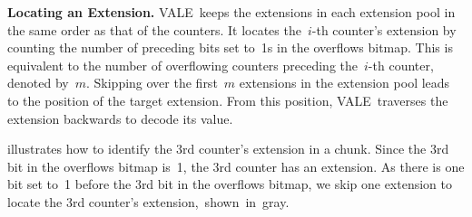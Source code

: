 \documentclass[sigconf]{acmart}
\newcommand{\counterencodingabbrv}{VALE}
\begin{document}
\textbf{Locating an Extension.}
\counterencodingabbrv\ keeps the extensions in each extension pool in the same
order as that of the counters. It locates the~$i${\nobreakdash-}th counter's
extension by counting the number of preceding bits set to~1s in the overflows
bitmap. This is equivalent to the number of overflowing counters preceding
the~$i${\nobreakdash-}th counter, denoted by~$m$. Skipping over the first~$m$
extensions in the extension pool leads to the position of the target extension.
From this position, \counterencodingabbrv\ traverses the extension backwards to
decode its value.

illustrates how to identify the 3rd counter's extension in a chunk. Since the
3rd bit in the overflows bitmap is~1, the 3rd counter has an extension. As
there is one bit set to~1 before the 3rd bit in the overflows bitmap, we skip
one extension to locate the 3rd counter's extension,~shown~in~gray.
\end{document}
